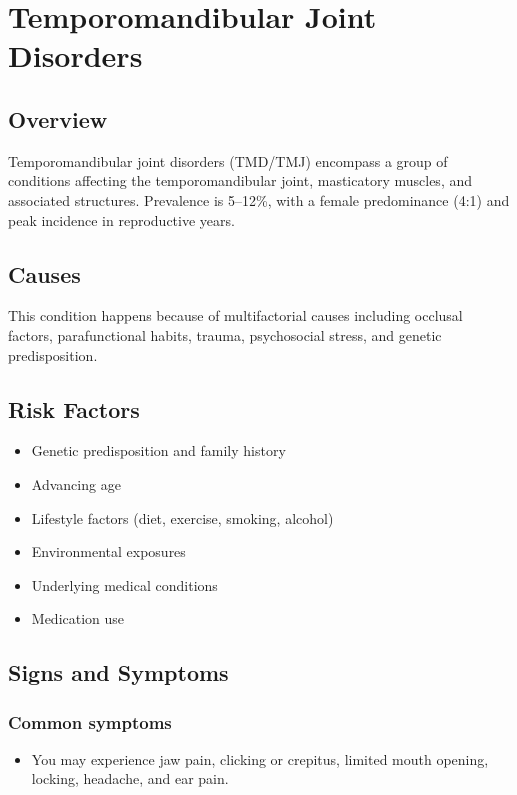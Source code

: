 \chapter{Temporomandibular Joint Disorders}
\label{sec:Temporomandibular Joint Disorders}

\section{Overview}
Temporomandibular joint disorders (TMD/TMJ) encompass a group of conditions affecting the temporomandibular joint, masticatory muscles, and associated structures. Prevalence is 5--12\%, with a female predominance (4:1) and peak incidence in reproductive years.
\section{Causes}
This condition happens because of multifactorial causes including occlusal factors, parafunctional habits, trauma, psychosocial stress, and genetic predisposition.     
\section{Risk Factors}

\begin{itemize}[noitemsep]
  \item Genetic predisposition and family history
  \item Advancing age
  \item Lifestyle factors (diet, exercise, smoking, alcohol)
  \item Environmental exposures
  \item Underlying medical conditions
  \item Medication use
\end{itemize}
\section{Signs and Symptoms}

\subsection{Common symptoms}
\begin{itemize}[noitemsep]
  \item You may experience jaw pain, clicking or crepitus, limited mouth opening, locking, headache, and ear pain. 
  \end{itemize}

